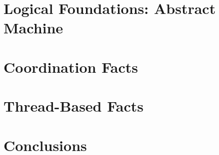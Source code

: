 \documentclass[12pt]{cmuthesis}
\theoremstyle{indented}
\begin{document}
\chapter{Logical Foundations: Abstract Machine}


\chapter{Coordination Facts}\label{chapter:coordination}


\chapter{Thread-Based Facts}


\chapter{Conclusions}


\appendix


\backmatter


\renewcommand{\bibsection}{\chapter{\bibname}}

\end{document}
